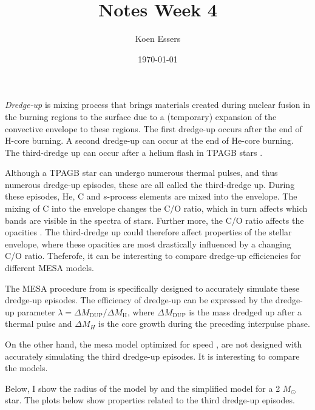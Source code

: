 \documentclass[a4paper,10pt]{article}
\title{Notes Week 4}
\author{Koen Essers}
\date{\today}
\begin{document}
\setuplayout
\tableofcontents
{}

    \emph{Dredge-up} is mixing process that brings materials created during nuclear fusion in the burning regions to the surface due to a (temporary) expansion of the convective envelope to these regions. The first dredge-up occurs after the end of H-core burning. A second dredge-up can occur at the end of He-core burning. The third-dredge up can occur after a helium flash in TPAGB stars \citep{herwig2005}.

    Although a TPAGB star can undergo numerous thermal pulses, and thus numerous dredge-up episodes, these are all called the third-dredge up.
    During these episodes, He, C and \(s\)-process elements are mixed into the envelope.
    The mixing of C into the envelope changes the C/O ratio, which in turn affects which bands are visible in the spectra of stars.
    Further more, the C/O ratio affects the opacities .
    The third-dredge up could therefore affect properties of the stellar envelope, where these opacities are most drastically influenced by a changing C/O ratio.
    Theferofe, it can be interesting to compare dredge-up efficiencies for different MESA models.

    The MESA procedure from \citet{rees2024b} is specifically designed to accurately simulate these dredge-up episodes.
    The efficiency of dredge-up can be expressed by the dredge-up parameter \(\lambda = \Delta M _\text{DUP} / \Delta M _\text{H}\), where \(\Delta M _\text{DUP}\) is the mass dredged up after a thermal pulse and \(\Delta M_{H} \) is the core growth during the preceding interpulse phase.

    On the other hand, the mesa model optimized for speed ,
    are not designed with accurately simulating the third dredge-up episodes.
    It is interesting to compare the models.

    Below, I show the radius of the model by \citet{rees2024b} and the simplified model for a 2 \(M_\odot \) star. The plots below show properties related to the third dredge-up episodes.

    \begin{figure}[ht]
    \end{figure}
\end{document}
